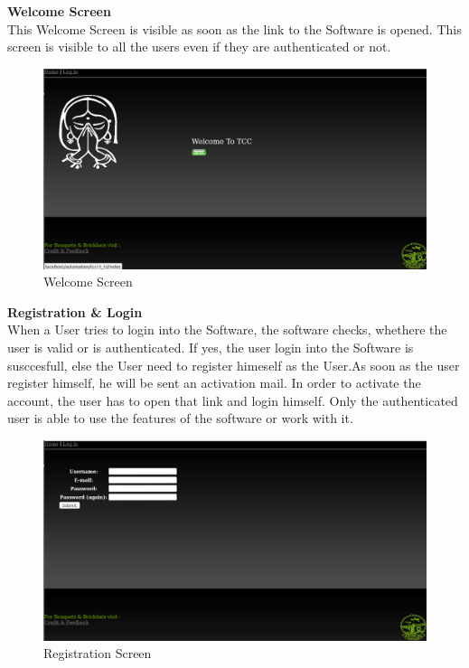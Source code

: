\newpage
{\bf Welcome Screen}\\

This Welcome Screen is visible as soon as the link to the Software is 
opened. This screen is visible to all the users even if they are 
authenticated or not.
\begin{figure}[h]
\vskip 2cm
\centering \includegraphics[scale=1.0]{images/welcome.png}
\caption{Welcome Screen}
\end{figure}

\newpage 
{\bf Registration \& Login}\\

When a User tries to login into the Software, the software checks, 
whethere the user is valid or is authenticated. If yes, the user login 
into the Software is susccesfull, else the User need to register 
himeself as the User.As soon as the user register himself, he will be 
sent an activation mail. In order to activate the account, the user 
has to open that link and login himself. Only the authenticated user 
is able to use the features of the software or work with it.
\begin{figure}[h]
\vskip 2cm
\centering \includegraphics[scale=1.0]{images/register1.png}
\caption{Registration Screen}
\end{figure}

